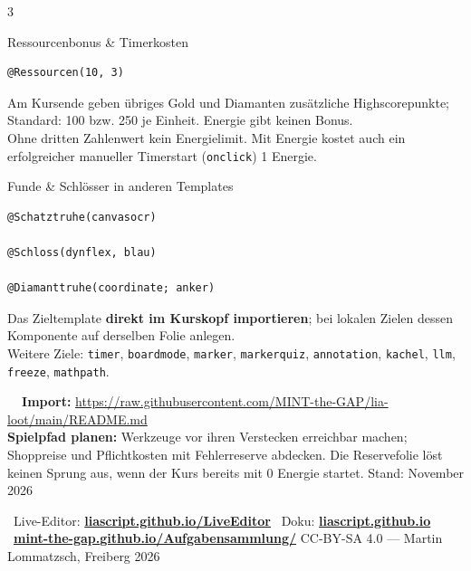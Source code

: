 \documentclass[a4paper,landscape,9pt]{extarticle}
\newcommand{\prevsm}[1]{{\footnotesize\color{muted} #1}}
\newcommand{\sheetfooter}{%
  \vfill
  {\sffamily\scriptsize\color{muted}
  \faInfoCircle~Live-Editor: \href{https://liascript.github.io/LiveEditor/}{\textbf{liascript.github.io/LiveEditor}}\hfill
  \faBook~Doku: \href{https://liascript.github.io}{\textbf{liascript.github.io}}\hfill
  \faGithub~\href{https://mint-the-gap.github.io/Aufgabensammlung/}{\textbf{mint-the-gap.github.io/Aufgabensammlung/}} \quad
  CC-BY-SA 4.0 — Martin Lommatzsch, Freiberg 2026}}
\begin{document}
\begin{multicols}{3}
\begin{lootcard}{Ressourcenbonus \& Timerkosten}
\begin{lstlisting}[language=lia]
@Ressourcen(10, 3)
\end{lstlisting}
\tcblower
\prevsm{Am Kursende geben übriges Gold und Diamanten zusätzliche Highscorepunkte; Standard: 100 bzw. 250 je Einheit. Energie gibt keinen Bonus.\\[2pt]
Ohne dritten Zahlenwert kein Energielimit. Mit Energie kostet auch ein erfolgreicher manueller Timerstart (\texttt{onclick}) 1 Energie.}
\end{lootcard}

\begin{lootcard}{Funde \& Schlösser in anderen Templates}
\begin{lstlisting}[language=lia]
@Schatztruhe(canvasocr)

@Schloss(dynflex, blau)

@Diamanttruhe(coordinate; anker)
\end{lstlisting}
\tcblower
\prevsm{Das Zieltemplate \textbf{direkt im Kurskopf importieren}; bei lokalen Zielen dessen Komponente auf derselben Folie anlegen.\\[2pt]
Weitere Ziele: \texttt{timer}, \texttt{boardmode}, \texttt{marker}, \texttt{markerquiz}, \texttt{annotation}, \texttt{kachel}, \texttt{llm}, \texttt{freeze}, \texttt{mathpath}.}
\end{lootcard}

\end{multicols}
\endgroup

\noindent\begin{tcolorbox}[
  enhanced, colback=loottealLt, colframe=lootteal!75,
  boxrule=0.3pt, arc=2pt, left=5pt,right=5pt,top=2pt,bottom=2pt,
  before skip=2pt,after skip=0pt
]
\scriptsize
\textbf{\color{lootteal}\faDownload~~Import:}
\url{https://raw.githubusercontent.com/MINT-the-GAP/lia-loot/main/README.md}\\[2pt]
\textbf{Spielpfad planen:} Werkzeuge vor ihren Verstecken erreichbar machen; Shoppreise und Pflichtkosten mit Fehlerreserve abdecken.
Die Reservefolie löst keinen Sprung aus, wenn der Kurs bereits mit 0 Energie startet. \hfill Stand: November 2026
\end{tcolorbox}
\sheetfooter

\newpage
\end{document}
